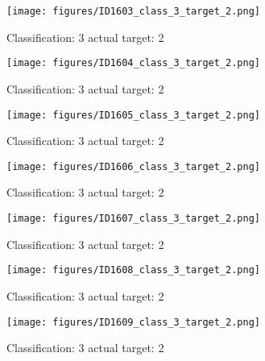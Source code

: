 \begin{figure}[h!]
\begin{center}
\texttt{[image: figures/ID1603\_class\_3\_target\_2.png]}
\end{center}
\caption{ Classification: 3 actual target: 2}
\label{fig:ID1603_class_3_target_2}
\end{figure}
\begin{figure}[h!]
\begin{center}
\texttt{[image: figures/ID1604\_class\_3\_target\_2.png]}
\end{center}
\caption{ Classification: 3 actual target: 2}
\label{fig:ID1604_class_3_target_2}
\end{figure}
\begin{figure}[h!]
\begin{center}
\texttt{[image: figures/ID1605\_class\_3\_target\_2.png]}
\end{center}
\caption{ Classification: 3 actual target: 2}
\label{fig:ID1605_class_3_target_2}
\end{figure}
\begin{figure}[h!]
\begin{center}
\texttt{[image: figures/ID1606\_class\_3\_target\_2.png]}
\end{center}
\caption{ Classification: 3 actual target: 2}
\label{fig:ID1606_class_3_target_2}
\end{figure}
\begin{figure}[h!]
\begin{center}
\texttt{[image: figures/ID1607\_class\_3\_target\_2.png]}
\end{center}
\caption{ Classification: 3 actual target: 2}
\label{fig:ID1607_class_3_target_2}
\end{figure}
\begin{figure}[h!]
\begin{center}
\texttt{[image: figures/ID1608\_class\_3\_target\_2.png]}
\end{center}
\caption{ Classification: 3 actual target: 2}
\label{fig:ID1608_class_3_target_2}
\end{figure}
\begin{figure}[h!]
\begin{center}
\texttt{[image: figures/ID1609\_class\_3\_target\_2.png]}
\end{center}
\caption{ Classification: 3 actual target: 2}
\label{fig:ID1609_class_3_target_2}
\end{figure}
